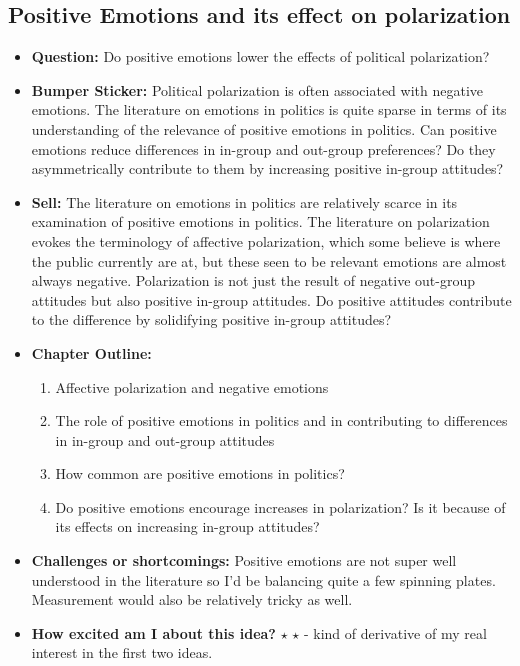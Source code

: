 \documentclass[12pt]{article}
\begin{document}
\subsection{Positive Emotions and its effect on polarization}
    \begin{itemize}
        \item \textbf{Question:} Do positive emotions lower the effects of political polarization?
        \item \textbf{Bumper Sticker:} Political polarization is often associated with negative emotions. The literature on emotions in politics is quite sparse in terms of its understanding of the relevance of positive emotions in politics. Can positive emotions reduce differences in in-group and out-group preferences? Do they asymmetrically contribute to them by increasing positive in-group attitudes?
        \item \textbf{Sell:} The literature on emotions in politics are relatively scarce in its examination of positive emotions in politics. The literature on polarization evokes the terminology of affective polarization, which some believe is where the public currently are at, but these seen to be relevant emotions are almost always negative. Polarization is not just the result of negative out-group attitudes but also positive in-group attitudes. Do positive attitudes contribute to the difference by solidifying positive in-group attitudes?
        \item \textbf{Chapter Outline:}
        \begin{enumerate}
            \item Affective polarization and negative emotions
            \item The role of positive emotions in politics and in contributing to differences in in-group and out-group attitudes
            \item How common are positive emotions in politics?
            \item Do positive emotions encourage increases in polarization? Is it because of its effects on increasing in-group attitudes?
        \end{enumerate}
        \item \textbf{Challenges or shortcomings:} Positive emotions are not super well understood in the literature so I'd be balancing quite a few spinning plates. Measurement would also be relatively tricky as well.
        \item \textbf{How excited am I about this idea?} $\star$ $\star$ - kind of derivative of my real interest in the first two ideas.
    \end{itemize}
\end{document}
